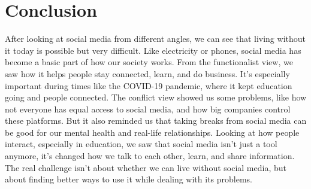 \documentclass{article}
\begin{document}
\section{Conclusion}
After looking at social media from different angles, we can see that living without it today is possible but very difficult. Like electricity or phones, social media has become a basic part of how our society works. From the functionalist view, we saw how it helps people stay connected, learn, and do business. It's especially important during times like the COVID-19 pandemic, where it kept education going and people connected. The conflict view showed us some problems, like how not everyone has equal access to social media, and how big companies control these platforms. But it also reminded us that taking breaks from social media can be good for our mental health and real-life relationships. Looking at how people interact, especially in education, we saw that social media isn't just a tool anymore, it's changed how we talk to each other, learn, and share information. The real challenge isn't about whether we can live without social media, but about finding better ways to use it while dealing with its problems.

\newpage


\end{document}
